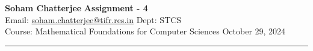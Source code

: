 \documentclass[a4paper, 11pt]{article}
\begin{document}
	
	
	{\noindent \large\textbf{Soham Chatterjee} \hfill \textbf{Assignment - 4}\\
		Email: \href{soham.chatterjee@tifr.res.in}{soham.chatterjee@tifr.res.in} \hfill Dept: STCS\\
		\normalsize Course: Mathematical Foundations for Computer Sciences \hfill October 29, 2024\\ 
		\noindent\rule{7in}{2.8pt}}
	
	
\end{document}
